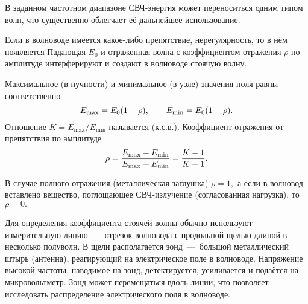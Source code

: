 В заданном частотном диапазоне СВЧ-энергия может переноситься одним типом волн,
что существенно облегчает её дальнейшее использование.

Если в волноводе имеется какое-либо препятствие, нерегулярность, то в нём
появляется  Падающая $E_0$ и отраженная волна с
коэффициентом отражения $\rho$ по амплитуде интерферируют и создают в волноводе
стоячую волну.

Максимальное (в пучности) и минимальное (в узле) значения поля равны
соответственно 
\begin{equation} \eqmark{2.0.5} 
E_{\text{max}}=E_0(1+\rho),
\qquad E_{\text{min}}=E_0(1-\rho). 
\end{equation} 
Отношение
$K=E_{\text{max}}/E_{\text{min}}$ называется  (к.с.в.). Коэффициент отражения от препятствия по амплитуде
\begin{equation} \eqmark{2.0.6}
\rho=\dfrac{E_{\text{max}}-E_{\text{min}}}{E_{\text{max}}+E_{\text{min}}}=\dfrac{K-1}{K+1}. 
\end{equation}

В случае полного отражения (металлическая заглушка) $\rho=1,$ а если в волновод
вставлено вещество, поглощающее СВЧ-­излучение (согласованная нагрузка), то
$\rho=0.$

Для определения коэффициента стоячей волны обычно используют измерительную
линию~---~отрезок волновода с продольной щелью длиной в несколько полуволн. В
щели располагается зонд~---~большой металлический штырь (антенна), реагирующий
на электрическое поле в волноводе. Напряжение высокой частоты, наводимое на
зонд, детектируется, усиливается и подаётся на микровольтметр. Зонд может
перемещаться вдоль линии, что позволяет исследовать распределение электрического
поля в волноводе.
